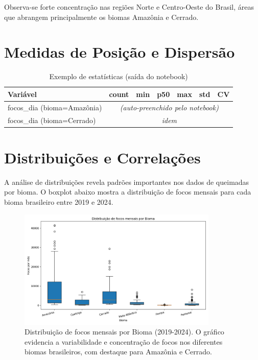 \documentclass[12pt,a4paper]{report}
\begin{document}
\noindent Observa-se forte concentração nas regiões Norte e Centro-Oeste do Brasil, áreas que abrangem principalmente os biomas Amazônia e Cerrado.

\section{Medidas de Posição e Dispersão}
\begin{table}[h]
\centering
\caption{Exemplo de estatísticas (saída do notebook)}
\label{tab:stats}
\begin{tabular}{lrrrrrr}
\toprule
\textbf{Variável} & \textbf{count} & \textbf{min} & \textbf{p50} & \textbf{max} & \textbf{std} & \textbf{CV} \\
\midrule
focos\_dia (bioma=Amazônia) & \multicolumn{6}{c}{\emph{(auto-preenchido pelo notebook)}}\\
focos\_dia (bioma=Cerrado)  & \multicolumn{6}{c}{\emph{idem}}\\
\bottomrule
\end{tabular}
\end{table}

\section{Distribuições e Correlações}

A análise de distribuições revela padrões importantes nos dados de queimadas por bioma. O boxplot abaixo mostra a distribuição de focos mensais para cada bioma brasileiro entre 2019 e 2024.

\begin{figure}[h]
\centering
\includegraphics[width=0.85\textwidth]{../figs/eda/boxplot_bioma.png}
\caption{Distribuição de focos mensais por Bioma (2019-2024). O gráfico evidencia a variabilidade e concentração de focos nos diferentes biomas brasileiros, com destaque para Amazônia e Cerrado.}
\label{fig:boxplot_bioma}
\end{figure}
\end{document}
